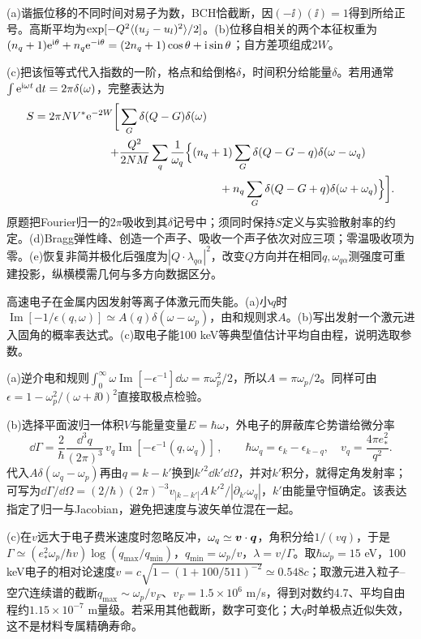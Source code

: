 \begin{solution}
(a)谐振位移的不同时间对易子为数，BCH恰截断，因$(-\ii)(\ii)=1$得到所给正号。高斯平均为$\exp[-Q^2\langle (u_j-u_l)^2\rangle/2]$。(b)位移自相关的两个本征权重为$(n_q+1)\mathrm e^{\mathrm i\theta}+n_q\mathrm e^{-\mathrm i\theta}=(2n_q+1)\cos\theta+\mathrm i\sin\theta$；自方差项组成$2W$。

(c)把该恒等式代入指数的一阶，格点和给倒格$\delta$，时间积分给能量$\delta$。若用通常$\int\mathrm e^{\mathrm i\omega t}\,\mathrm d t=2\pi\delta(\omega)$，完整表达为
\begin{align}
S=2\pi NV^*\e^{-2W}\bigg[&\sum_G\delta(Q-G)\delta(\omega)\\
+&\frac{Q^2}{2NM}\sum_q\frac1{\omega_q}\Big\{(n_q+1)\sum_G\delta(Q-G-q)\delta(\omega-\omega_q)\nonumber\\
&\hspace{31mm}+n_q\sum_G\delta(Q-G+q)\delta(\omega+\omega_q)\Big\}\bigg].\nonumber
\end{align}
原题把Fourier归一的$2\pi$吸收到其$\delta$记号中；须同时保持$S$定义与实验散射率的约定。(d)Bragg弹性峰、创造一个声子、吸收一个声子依次对应三项；零温吸收项为零。(e)恢复非简并极化后强度为$|Q\cdot\lambda_{q\alpha}|^2$，改变$Q$方向并在相同$q,\omega_{q\alpha}$测强度可重建投影，纵横模需几何与多方向数据区分。
\end{solution}
\begin{exercise}[原题1(a)--(c)]\label{p:512-2-1}
高速电子在金属内因发射等离子体激元而失能。(a)小$q$时$\operatorname{Im}[-1/\epsilon(q,\omega)]\simeq A(q)\delta(\omega-\omega_p)$，由和规则求$A$。(b)写出发射一个激元进入固角的概率表达式。(c)取电子能100 keV等典型值估计平均自由程，说明选取参数。
\end{exercise}
\begin{solution}
(a)逆介电和规则$\int_0^\infty\omega\operatorname{Im}[-\epsilon^{-1}]\dd\omega=\pi\omega_p^2/2$，所以$A=\pi\omega_p/2$。同样可由$\epsilon=1-\omega_p^2/(\omega+\ii0)^2$直接取极点检验。

(b)选择平面波归一体积$V$与能量变量$E=\hbar\omega$，外电子的屏蔽库仑势谱给微分率
\begin{equation}
\dd\Gamma=\frac2\hbar\frac{\dd^3q}{(2\pi)^3}\,v_q\operatorname{Im}[-\epsilon^{-1}(q,\omega_q)]\,,\qquad \hbar\omega_q=\epsilon_k-\epsilon_{k-q},\quad v_q=\frac{4\pi e_*^2}{q^2}.
\end{equation}
代入$A\delta(\omega_q-\omega_p)$再由$q=k-k'$换到$k'^2\dd k'\dd\Omega$，并对$k'$积分，就得定角发射率；可写为$\dd\Gamma/\dd\Omega=(2/\hbar)(2\pi)^{-3}v_{|k-k'|}A\,k'^2/|\partial_{k'}\omega_q|$，$k'$由能量守恒确定。该表达指定了归一与Jacobian，避免把速度与波矢单位混在一起。

(c)在$v$远大于电子费米速度时忽略反冲，$\omega_q\simeq\boldsymbol{v}\cdot\boldsymbol{q}$，角积分给$1/(vq)$，于是$\Gamma\simeq(e_*^2\omega_p/\hbar v)\log(q_{\max}/q_{\min})$，$q_{\min}=\omega_p/v$，$\lambda=v/\Gamma$。取$\hbar\omega_p=15$ eV，100 keV电子的相对论速度$v=c\sqrt{1-(1+100/511)^{-2}}\simeq0.548c$；取激元进入粒子--空穴连续谱的截断$q_{\max}\sim\omega_p/v_F$、$v_F=1.5\times10^6$ m/s，得到对数约4.7、平均自由程约$1.15\times10^{-7}$ m量级。若采用其他截断，数字可变化；大$q$时单极点近似失效，这不是材料专属精确寿命。
\end{solution}
